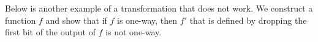 \newcommand{\bin}{\{0,1\}}
\newcommand{\adv}{\mathcal{A}}
\newcommand{\advb}{\mathcal{B}}
\newcommand{\advc}{\mathcal{C}}




Below is another example of a transformation that does not work.
We construct a function $f$ and show that if $f$ is one-way, then $f'$ that is defined by dropping the first bit of the output of $f$ is not one-way.


